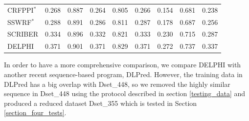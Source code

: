 \documentclass{bioinfo}
\begin{document}
\begin{table}[H]
\begin{tabular}{@{}l@{\ }*{8}{r}}
    CRFPPI${}^*$ & \cellcolor[rgb]{ .698,  .78,  .643}0.268 & \cellcolor[rgb]{ .635,  .733,  .569}0.887 & \cellcolor[rgb]{ .714,  .792,  .659}0.264 & \cellcolor[rgb]{ .667,  .757,  .604}0.805 & \cellcolor[rgb]{ .706,  .784,  .651}0.266 & \cellcolor[rgb]{ .698,  .78,  .643}0.154 & \cellcolor[rgb]{ .502,  .635,  .412}0.681 & \cellcolor[rgb]{ .706,  .784,  .651}0.238 \\
    SSWRF${}^*$ & \cellcolor[rgb]{ .627,  .729,  .561}0.288 & \cellcolor[rgb]{ .549,  .671,  .471}0.891 & \cellcolor[rgb]{ .635,  .733,  .569}0.286 & \cellcolor[rgb]{ .584,  .694,  .506}0.811 & \cellcolor[rgb]{ .631,  .729,  .565}0.287 & \cellcolor[rgb]{ .624,  .725,  .557}0.178 & \cellcolor[rgb]{ .482,  .624,  .388}0.687 & \cellcolor[rgb]{ .639,  .737,  .573}0.256 \\
    SCRIBER & \cellcolor[rgb]{ .463,  .608,  .365}0.334 & \cellcolor[rgb]{ .443,  .592,  .341}0.896 & \cellcolor[rgb]{ .471,  .612,  .373}0.332 & \cellcolor[rgb]{ .443,  .592,  .341}0.821 & \cellcolor[rgb]{ .467,  .612,  .369}0.333 & \cellcolor[rgb]{ .463,  .608,  .365}0.230 & \cellcolor[rgb]{ .4,  .561,  .29}0.715 & \cellcolor[rgb]{ .522,  .651,  .435}0.287 \\
    DELPHI & \cellcolor[rgb]{ .329,  .51,  .208}0.371 & \cellcolor[rgb]{ .329,  .51,  .208}0.901 & \cellcolor[rgb]{ .329,  .51,  .208}0.371 & \cellcolor[rgb]{ .329,  .51,  .208}0.829 & \cellcolor[rgb]{ .329,  .51,  .208}0.371 & \cellcolor[rgb]{ .329,  .51,  .208}0.272 & \cellcolor[rgb]{ .329,  .51,  .208}0.737 & \cellcolor[rgb]{ .329,  .51,  .208}0.337 \\
    \end{tabular}%
  \label{tab_comp_448}%
\end{table}%

In order to have a more comprehensive comparison, we compare DELPHI with another recent sequence-based program, DLPred. However, the training data in DLPred has a big overlap with Dset\_448, so we removed the highly similar sequence in Dset\_448 using the protocol described in section \ref{testing_data} and produced a reduced dataset Dset\_355 which is tested in Section \ref{section_four_tests}. 
\end{document}
